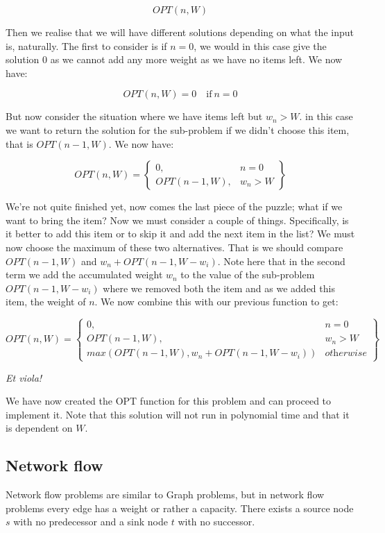 \documentclass[12pt]{article} %
\begin{document}
\[ OPT(n, W) \]

Then we realise that we will have different solutions depending on what the input is, naturally. The first to consider is if $n = 0$, we would in this case give the solution $0$ as we cannot add any more weight as we have no items left. We now have:

\[ OPT(n, W) = 0 \quad \textrm{if}\ n = 0\]

But now consider the situation where we have items left but $w_{n} > W$. in this case we want to return the solution for the sub-problem if we didn't choose this item, that is $OPT(n - 1, W)$. We now have:

\[
    OPT(n, W) = \left\{
        \begin{array}{ll}
            0, & n = 0 \\
            OPT(n - 1, W), & w_{n} > W
        \end{array}
    \right\}
\]

We're not quite finished yet, now comes the last piece of the puzzle; what if we want to bring the item? Now we must consider a couple of things. Specifically, is it better to add this item or to skip it and add the next item in the list? We must now choose the maximum of these two alternatives. That is we should compare $OPT(n - 1, W)$ and $w_{n} + OPT(n - 1, W - w_{i})$. Note here that in the second term we add the accumulated weight $w_{n}$ to the value of the sub-problem $OPT(n - 1, W - w_{i})$ where we removed both the item and as we added this item, the weight of $n$. We now combine this with our previous function to get:

\[
    OPT(n, W) = \left\{
        \begin{array}{ll}
            0, & n = 0 \\
            OPT(n - 1, W), & w_{n} > W \\
            max(OPT(n - 1, W), w_{n} + OPT(n - 1, W - w_{i})) & \textit{otherwise}
        \end{array}
    \right\}
\]
\begin{center}
\textit{Et viola!}
\end{center}
We have now created the OPT function for this problem and can proceed to implement it. Note that this solution will not run in polynomial time and that it is dependent on $W$. 

\subsection{Network flow} %
Network flow problems are similar to Graph problems, but in network flow problems every edge has a weight or rather a capacity. There exists a source node $s$ with no predecessor and a sink node $t$ with no successor.
\end{document}
